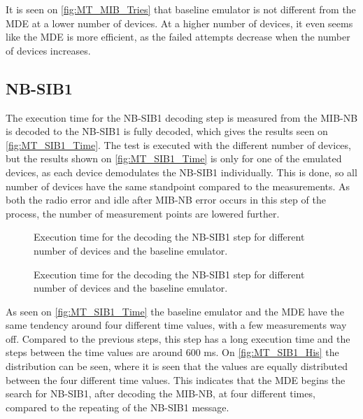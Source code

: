 It is seen on \autoref{fig:MT_MIB_Tries} that baseline emulator is not different from the MDE at a lower number of devices. At a higher number of devices, it even seems like the MDE is more efficient, as the failed attempts decrease when the number of devices increases.

\subsection{NB-SIB1}
The execution time for the NB-SIB1 decoding step is measured from the MIB-NB is decoded to the NB-SIB1 is fully decoded, which gives the results seen on \autoref{fig:MT_SIB1_Time}. The test is executed with the different number of devices, but the results shown on \autoref{fig:MT_SIB1_Time} is only for one of the emulated devices, as each device demodulates the NB-SIB1 individually. This is done, so all number of devices have the same standpoint compared to the measurements.
As both the radio error and idle after MIB-NB error occurs in this step of the process, the number of measurement points are lowered further.

\captionsetup{belowskip=0em}
\begin{minipage}{0.48\textwidth}
\begin{figure}[H]
\centering
\resizebox{\textwidth}{!}{
}
\caption{Execution time for the decoding the NB-SIB1 step for different number of devices and the baseline emulator.}
\label{fig:MT_SIB1_Time}
\end{figure}
\end{minipage}%
\hfill
\begin{minipage}{0.48\textwidth}
\begin{figure}[H]
\centering
\resizebox{\textwidth}{!}{
}
\caption{Execution time for the decoding the NB-SIB1 step for different number of devices and the baseline emulator.}
\label{fig:MT_SIB1_His}
\end{figure}
\end{minipage}
\captionsetup{belowskip=-1.5em}

As seen on \autoref{fig:MT_SIB1_Time} the baseline emulator and the MDE have the same tendency around four different time values, with a few measurements way off. Compared to the previous steps, this step has a long execution time and the steps between the time values are around 600 ms. On \autoref{fig:MT_SIB1_His}  the distribution can be seen, where it is seen that the values are equally distributed between the four different time values. This indicates that the MDE begins the search for NB-SIB1, after decoding the MIB-NB, at four different times, compared to the repeating of the NB-SIB1 message.


